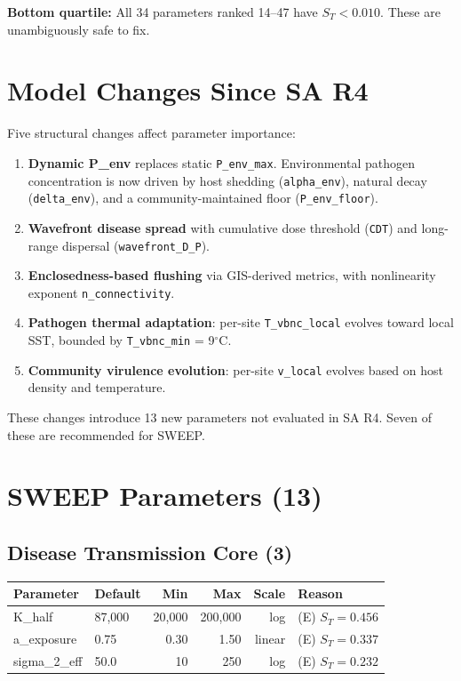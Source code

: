 \documentclass[11pt,a4paper]{article}
\begin{document}
\noindent\textbf{Bottom quartile:} All 34 parameters ranked 14--47 have $S_T < 0.010$. These are unambiguously safe to fix.

\section{Model Changes Since SA R4}

Five structural changes affect parameter importance:

\begin{enumerate}
    \item \textbf{Dynamic P\_env} replaces static \texttt{P\_env\_max}. Environmental pathogen concentration is now driven by host shedding (\texttt{alpha\_env}), natural decay (\texttt{delta\_env}), and a community-maintained floor (\texttt{P\_env\_floor}).
    \item \textbf{Wavefront disease spread} with cumulative dose threshold (\texttt{CDT}) and long-range dispersal (\texttt{wavefront\_D\_P}).
    \item \textbf{Enclosedness-based flushing} via GIS-derived metrics, with nonlinearity exponent \texttt{n\_connectivity}.
    \item \textbf{Pathogen thermal adaptation}: per-site \texttt{T\_vbnc\_local} evolves toward local SST, bounded by \texttt{T\_vbnc\_min} = 9$^\circ$C.
    \item \textbf{Community virulence evolution}: per-site \texttt{v\_local} evolves based on host density and temperature.
\end{enumerate}

These changes introduce 13 new parameters not evaluated in SA R4. Seven of these are recommended for SWEEP.

\section{SWEEP Parameters (13)}

\subsection{Disease Transmission Core (3)}

\begin{table}[H]
\centering
\begin{tabular}{llrrrl}
\toprule
\textbf{Parameter} & \textbf{Default} & \textbf{Min} & \textbf{Max} & \textbf{Scale} & \textbf{Reason} \\
\midrule
K\_half & 87{,}000 & 20{,}000 & 200{,}000 & log & (E) $S_T = 0.456$ \\
a\_exposure & 0.75 & 0.30 & 1.50 & linear & (E) $S_T = 0.337$ \\
sigma\_2\_eff & 50.0 & 10 & 250 & log & (E) $S_T = 0.232$ \\
\bottomrule
\end{tabular}
\end{table}
\end{document}
